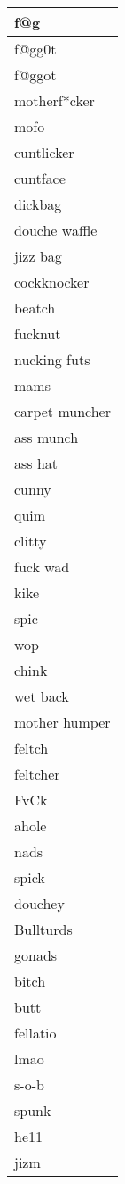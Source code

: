 \begin{longtable}{|l|}
f@g \\ \hline 
f@gg0t \\ \hline 
f@ggot \\ \hline 
motherf*cker \\ \hline 
mofo \\ \hline 
cuntlicker \\ \hline 
cuntface \\ \hline 
dickbag \\ \hline 
douche waffle \\ \hline 
jizz bag \\ \hline 
cockknocker \\ \hline 
beatch \\ \hline 
fucknut \\ \hline 
nucking futs \\ \hline 
mams \\ \hline 
carpet muncher \\ \hline 
ass munch \\ \hline 
ass hat \\ \hline 
cunny \\ \hline 
quim \\ \hline 
clitty \\ \hline 
fuck wad \\ \hline 
kike \\ \hline 
spic \\ \hline 
wop \\ \hline 
chink \\ \hline 
wet back \\ \hline 
mother humper \\ \hline 
feltch \\ \hline 
feltcher \\ \hline 
FvCk \\ \hline 
ahole \\ \hline 
nads \\ \hline 
spick \\ \hline 
douchey \\ \hline 
Bullturds \\ \hline 
gonads \\ \hline 
bitch \\ \hline 
butt \\ \hline 
fellatio \\ \hline 
lmao \\ \hline 
s-o-b \\ \hline 
spunk \\ \hline 
he11 \\ \hline 
jizm \\ \hline 

\end{longtable}

